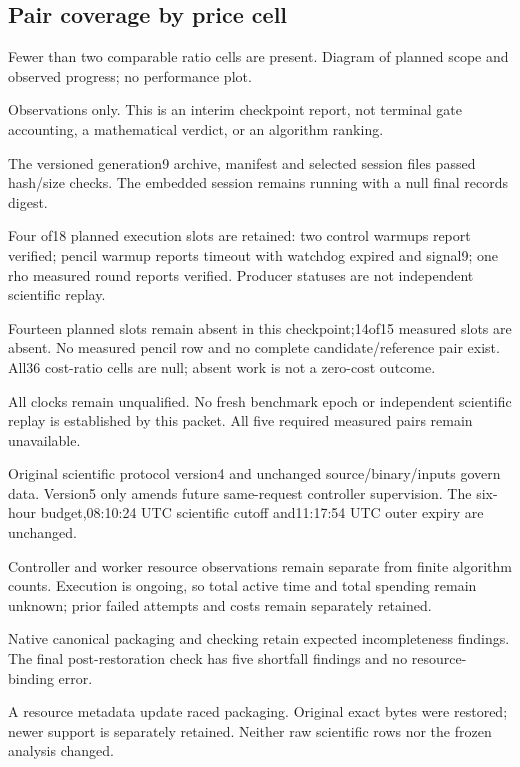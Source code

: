 \documentclass[10pt]{article}
\begin{document}
\subsection*{Pair coverage by price cell}
\par
Fewer than two comparable ratio cells are present. Diagram of planned scope and observed progress; no performance plot.\par
Observations only. This is an interim checkpoint report, not terminal gate accounting, a mathematical verdict, or an algorithm ranking.\par
The versioned generation9 archive, manifest and selected session files passed hash/size checks. The embedded session remains running with a null final records digest.\par
Four of18 planned execution slots are retained: two control warmups report verified; pencil warmup reports timeout with watchdog expired and signal9; one rho measured round reports verified. Producer statuses are not independent scientific replay.\par
Fourteen planned slots remain absent in this checkpoint;14of15 measured slots are absent. No measured pencil row and no complete candidate/reference pair exist. All36 cost-ratio cells are null; absent work is not a zero-cost outcome.\par
All clocks remain unqualified. No fresh benchmark epoch or independent scientific replay is established by this packet. All five required measured pairs remain unavailable.\par
Original scientific protocol version4 and unchanged source/binary/inputs govern data. Version5 only amends future same-request controller supervision. The six-hour budget,08:10:24 UTC scientific cutoff and11:17:54 UTC outer expiry are unchanged.\par
Controller and worker resource observations remain separate from finite algorithm counts. Execution is ongoing, so total active time and total spending remain unknown; prior failed attempts and costs remain separately retained.\par
Native canonical packaging and checking retain expected incompleteness findings. The final post-restoration check has five shortfall findings and no resource-binding error.\par
A resource metadata update raced packaging. Original exact bytes were restored; newer support is separately retained. Neither raw scientific rows nor the frozen analysis changed.\par
\end{document}
